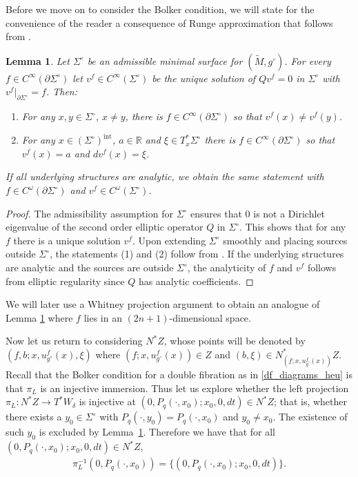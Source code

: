 \documentclass[11pt]{amsart}
\newtheorem{Lemma}[Theorem]{Lemma}
\theoremstyle{definition}
\numberwithin{equation}{section}
\newcommand{\mR}{\mathbb{R}}                    %
\begin{document}
Before we move on to consider the Bolker condition, we will state for the convenience of the reader a consequence of Runge approximation that follows from \cite[Appendix A]{LLS}. 

\begin{Lemma}\label{lem:runge}
    Let $\Sigma^\circ$ be an admissible minimal surface for $(\widetilde{M},g^\circ)$. %
    For every $f\in C^{\infty}(\partial\Sigma^\circ)$ let $v^f \in C^{\infty}(\Sigma^\circ)$ be the unique solution of $Q v^f = 0$ in $\Sigma^\circ$ with $v^f\vert_{\partial\Sigma^\circ} = f$. Then: %
    \begin{enumerate}
        \item For any $x,y\in \Sigma^\circ$, $x\neq y$, there is $f\in C^{\infty}(\partial\Sigma^\circ)$ so that $v^f(x)\neq v^f(y)$.
        \item For any $x\in (\Sigma^\circ)^{\mathrm{int}}$, $a \in \mR$ and $\xi \in T_x^\ast \Sigma^\circ$ there is $f\in C^{\infty}(\partial\Sigma^\circ)$ so that $v^f(x) = a$ and $d v^f(x)=\xi$.
    \end{enumerate}
    If all underlying structures are analytic, we obtain the same statement with $f\in C^\omega(\partial\Sigma^\circ)$ and $v^f \in C^\omega(\Sigma^\circ)$.
\end{Lemma}
\begin{proof}
The admissibility assumption for $\Sigma^\circ$ ensures that $0$ is not a Dirichlet eigenvalue of the second order elliptic operator $Q$ in $\Sigma^\circ$. This shows that for any $f$ there is a unique solution $v^f$. Upon extending $\Sigma^{\circ}$ smoothly and placing sources outside $\Sigma^{\circ}$, the statements (1) and (2) follow from \cite[Proposition A.7 and its proof]{LLS}. If the underlying structures are analytic and the sources are outside $\Sigma^{\circ}$, the analyticity of $f$ and $v^f$ follows from elliptic regularity since $Q$ has analytic coefficients.
\end{proof}

We will later use a Whitney projection argument to obtain an analogue of Lemma \ref{lem:runge} where $f$ lies in an $(2n+1)$-dimensional space.

Now let us return to considering $N^\ast Z$, whose points will be denoted by $(f, b; x,  u^f_{g^{\circ}}(x), \xi)$ where $(f; x, u^f_{g^{\circ}}(x)) \in Z$ and $(b,\xi) \in N^*_{(f;x,u^f_{g^\circ}(x))} Z$. Recall that the Bolker condition for a double fibration as in \eqref{df_diagrams_heu} is that $\pi_L$ is an injective immersion. Thus let us explore whether the left projection $\pi_L : N^*Z \to T^* W_\delta$ is injective at $(0, P_q(\cdot, x_0); x_0, 0,  dt) \in N^*Z$; that is, whether there exists a $y_0\in \Sigma^\circ$ with $P_q(\cdot, y_0) = P_q(\cdot, x_0)$ and $y_0\neq x_0$. The existence of such $y_0$ is excluded by Lemma~\ref{lem:runge}. Therefore we have that for all $(0, P_q(\cdot, x_0); x_0, 0, dt) \in N^*Z$, 
\begin{eqnarray}\label{eq: formally injective}
\pi_{L}^{-1}(0, P_q(\cdot, x_0)) =\{ (0, P_q(\cdot, x_0); x_0, 0, dt)\}.
\end{eqnarray}
\end{document}
